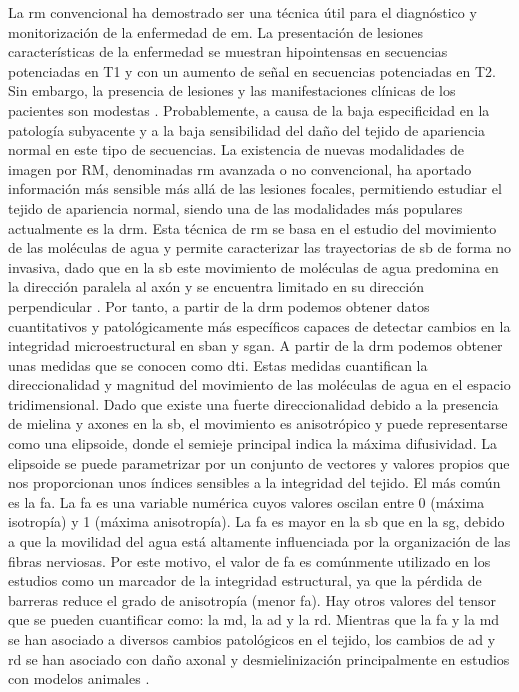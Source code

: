La \gls{rm} convencional ha demostrado ser una  técnica útil para el diagnóstico y monitorización de la enfermedad de \gls{em}.  La presentación de lesiones características de la enfermedad se muestran hipointensas en secuencias potenciadas en T1 y con un aumento de señal en secuencias potenciadas en T2. Sin embargo, la presencia de lesiones y las manifestaciones clínicas de los pacientes son modestas \cite{Barkhof2002TheRevisited}. Probablemente, a causa de la baja especificidad en la patología subyacente y a la baja sensibilidad del daño del tejido de apariencia normal en este tipo de secuencias.  La existencia de nuevas modalidades de imagen por RM, denominadas \gls{rm} avanzada o no convencional, ha aportado información más sensible más allá de las lesiones focales, permitiendo estudiar el tejido de apariencia normal, siendo una de las modalidades más populares actualmente es la \gls{drm}. Esta técnica de \gls{rm} se basa en el estudio del movimiento de las moléculas de agua y permite caracterizar las trayectorias de \gls{sb} de forma no invasiva, dado que en la \gls{sb} este movimiento de moléculas de agua predomina en la dirección paralela al axón y se encuentra limitado en su dirección perpendicular \cite{Basser2000InDatab}.  Por tanto, a partir de la \gls{drm} podemos obtener datos cuantitativos y patológicamente más específicos capaces de detectar cambios en la integridad microestructural en \gls{sban} y \gls{sgan}. A partir de la \gls{drm} podemos obtener unas medidas que se conocen como \gls{dti}. Estas medidas cuantifican la direccionalidad y magnitud del movimiento de las moléculas de agua en el espacio tridimensional. Dado que existe una fuerte direccionalidad debido a la presencia de mielina y axones en la \gls{sb}, el movimiento es anisotrópico y puede representarse como una elipsoide, donde el semieje principal indica la máxima difusividad. La elipsoide se puede parametrizar por un conjunto de vectores y valores propios que nos proporcionan unos índices sensibles a la integridad del tejido. El más común es la \gls{fa}. La \gls{fa} es una variable numérica cuyos valores oscilan entre 0 (máxima isotropía) y 1 (máxima anisotropía). La \gls{fa} es mayor en la \gls{sb} que en la \gls{sg}, debido a que la movilidad del agua está altamente influenciada por la organización de las fibras nerviosas. Por este motivo, el valor de \gls{fa} es comúnmente utilizado en los estudios como un marcador de la integridad estructural, ya que la pérdida de barreras reduce el grado de anisotropía (menor \gls{fa}). Hay otros valores del tensor que se pueden cuantificar como: la \gls{md}, la \gls{ad} y la \gls{rd}. Mientras que la \gls{fa} y la \gls{md} se han asociado a diversos cambios patológicos en el tejido, los cambios de \gls{ad} y \gls{rd} se han asociado con daño axonal y desmielinización principalmente en estudios con modelos animales \cite{Song2005DemyelinationBrain}.

